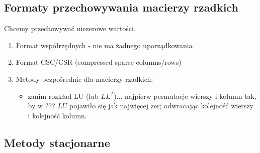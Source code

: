 \documentclass[hidelinks,a4paper,fleqn]{article}
\begin{document}
\subsection{Formaty przechowywania macierzy rzadkich}

Chcemy przechowywać niezerowe wartości.

\begin{enumerate}
	\item Format współrzędnych - nie ma żadnego uporządkowania
	      	
	\item Format CSC/CSR (compressed sparse columns/rows)
	      
	\item Metody bezpośrednie dla macierzy rzadkich:
	      \begin{itemize}
	      	\item zanim rozkład LU (lub $LL^T$)... najpierw permutacje wierszy i kolumn tak, by w ??? $LU$ pojawiło się jak najwięcej zer;
	      	      odwracając kolejność wierszy i kolejność kolumn.
	      \end{itemize}
\end{enumerate}


\subsection{Metody stacjonarne}
\end{document}
